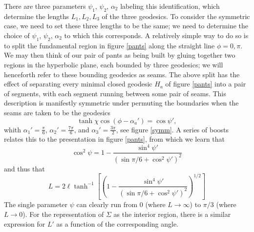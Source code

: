\documentclass[12pt]{article}
\numberwithin{equation}{section}
\begin{document}
There are three parameters $\psi_1$, $\psi_2$, $\alpha_2$ labeling this identification, which determine the lengths $L_1, L_2, L_3$ of the three geodesics. To consider the symmetric case, we need to set these three lengths to be the same; we need to determine the choice of $\psi_1$, $\psi_2$, $\alpha_2$ to which this corresponds. A relatively simple way to do so is to split the fundamental region in figure \ref{pants} along the straight line $\phi =0, \pi$.  We may then think of our pair of pants as being built by gluing together two regions in the hyperbolic plane, each bounded by three geodesics;  we will henceforth refer to these bounding geodesics as seams.  The above split has the effect of separating every minimal closed geodesic $H_a$ of figure \ref{pants} into a pair of segments, with each segment running between some pair of seams.  This description is manifestly symmetric under permuting the boundaries when the seams are taken to be the geodesics
\begin{equation}
\tanh \chi \cos (\phi - \alpha_a') = \cos \psi',
\end{equation}
whith $\alpha_1' = \frac{\pi}{6}$, $\alpha_2' = \frac{7\pi}{6}$, and $\alpha_3' = \frac{3\pi}{2}$, see figure \ref{symm}. A series of boosts relates this to the presentation in figure \ref{pants}, from which we learn that
\begin{equation}
\cos^2 \psi = 1- \frac{ \sin^4 \psi'}{(\sin \pi/6 + \cos^2\psi')^2}
\end{equation}
and thus that
\begin{equation}
L = 2 \ell \tanh^{-1} \left[ \left( 1- \frac{ \sin^4 \psi'}{(\sin \pi/6 + \cos^2\psi')^2 }\right)^{1/2} \right]
\end{equation}
The single parameter $\psi$ can clearly run from $0$ (where $L \to \infty$) to $\pi/3$ (where $L \to 0$). For the representation of $\Sigma$ as the interior region, there is a similar expression for $L'$ as a function of the corresponding angle.
\end{document}
